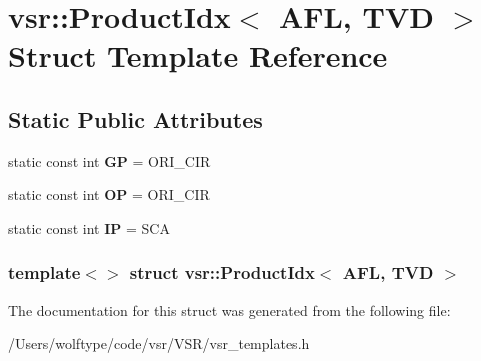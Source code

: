 \hypertarget{structvsr_1_1_product_idx_3_01_a_f_l_00_01_t_v_d_01_4}{\section{vsr\-:\-:Product\-Idx$<$ A\-F\-L, T\-V\-D $>$ Struct Template Reference}
\label{structvsr_1_1_product_idx_3_01_a_f_l_00_01_t_v_d_01_4}
}
\subsection*{Static Public Attributes}
\begin{DoxyCompactItemize}
\item 
\hypertarget{structvsr_1_1_product_idx_3_01_a_f_l_00_01_t_v_d_01_4_a7af67fd9fddc71dc8fe3e25ea51593a0}{static const int {\bfseries G\-P} = O\-R\-I\-\_\-\-C\-I\-R}\label{structvsr_1_1_product_idx_3_01_a_f_l_00_01_t_v_d_01_4_a7af67fd9fddc71dc8fe3e25ea51593a0}

\item 
\hypertarget{structvsr_1_1_product_idx_3_01_a_f_l_00_01_t_v_d_01_4_ac7db1e2bbe93e060f6a5eb4d94c89065}{static const int {\bfseries O\-P} = O\-R\-I\-\_\-\-C\-I\-R}\label{structvsr_1_1_product_idx_3_01_a_f_l_00_01_t_v_d_01_4_ac7db1e2bbe93e060f6a5eb4d94c89065}

\item 
\hypertarget{structvsr_1_1_product_idx_3_01_a_f_l_00_01_t_v_d_01_4_ad1763f76c213a3e819109bde17f191d5}{static const int {\bfseries I\-P} = S\-C\-A}\label{structvsr_1_1_product_idx_3_01_a_f_l_00_01_t_v_d_01_4_ad1763f76c213a3e819109bde17f191d5}

\end{DoxyCompactItemize}
\subsubsection*{template$<$$>$ struct vsr\-::\-Product\-Idx$<$ A\-F\-L, T\-V\-D $>$}



The documentation for this struct was generated from the following file\-:\begin{DoxyCompactItemize}
\item 
/\-Users/wolftype/code/vsr/\-V\-S\-R/vsr\-\_\-templates.\-h\end{DoxyCompactItemize}
